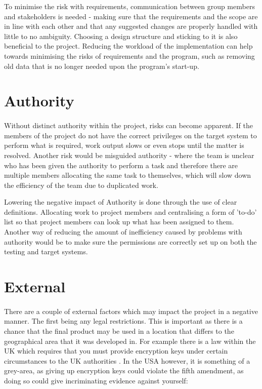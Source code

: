 To minimise the risk with requirements, communication between group members and
stakeholders is needed - making sure that the requirements and the scope are in
line with each other and that any suggested changes are properly handled with
little to no ambiguity.  Choosing a design structure and sticking to it is also
beneficial to the project.  Reducing the workload of the implementation can
help towards minimising the risks of requirements and the program, such as
removing old data that is no longer needed upon the program's start-up.

\section{Authority}
\paragraph{}

Without distinct authority within the project, risks can become apparent.
If the members of the project do not have the correct privileges on the target
system to perform what is required, work output slows or even stops until the
matter is resolved.  Another risk would be misguided authority - where the team
is unclear who has been given the authority to perform a task and therefore 
there are multiple members allocating the same task to themselves, which will
slow down the efficiency of the team due to duplicated work.

Lowering the negative impact of Authority is done through the use of clear
definitions.  Allocating work to project members and centralising a form of
'to-do' list so that project members can look up what has been assigned to them.
Another way of reducing the amount of inefficiency caused by problems with
authority would be to make sure the permissions are correctly set up on both the
testing and target systems.

\section{External}
\paragraph{}

There are a couple of external factors which may impact the project in a
negative manner.  The first being any legal restrictions.  This is important as
there is a chance that the final product may be used in a location that differs
to the geographical area that it was developed in.  For example there is a law
within the UK which requires that you must provide encryption keys under certain
circumstances to the UK authorities \cite{ripaIII}\cite{ukCryptLaw}. In the USA
however, it is something of a grey-area, as giving up encryption keys could
violate the fifth amendment, as doing so could give incriminating evidence
against yourself:

